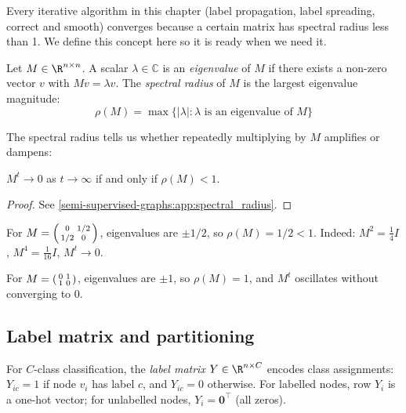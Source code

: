 \begin{notechapter}
Every iterative algorithm in this chapter (label propagation, label spreading,
correct and smooth) converges because a certain matrix has spectral radius less
than 1. We define this concept here so it is ready when we need it.

\begin{definition}
\label{semi-supervised-graphs:def:spectral_radius}
Let $M \in \R^{n \times n}$. A scalar $\lambda \in \mathbb{C}$ is an
\emph{eigenvalue} of $M$ if there exists a non-zero vector $v$ with
$Mv = \lambda v$. The \emph{spectral radius} of $M$ is the largest
eigenvalue magnitude:
\begin{equation}
\rho(M) = \max\{|\lambda| : \lambda \text{ is an eigenvalue of } M\}
\end{equation}
\end{definition}

The spectral radius tells us whether repeatedly multiplying by $M$ amplifies
or dampens:

\begin{proposition}
\label{semi-supervised-graphs:prop:spectral_powers}
$M^t \to 0$ as $t \to \infty$ if and only if $\rho(M) < 1$.
\end{proposition}

\begin{proof}
See \cref{semi-supervised-graphs:app:spectral_radius}.
\end{proof}

\begin{example}
For $M = \begin{psmallmatrix} 0 & 1/2 \\ 1/2 & 0 \end{psmallmatrix}$,
eigenvalues are $\pm 1/2$, so $\rho(M) = 1/2 < 1$. Indeed:
$M^2 = \frac{1}{4}I$, $M^4 = \frac{1}{16}I$, $M^t \to 0$.

For $M = \begin{psmallmatrix} 0 & 1 \\ 1 & 0 \end{psmallmatrix}$,
eigenvalues are $\pm 1$, so $\rho(M) = 1$, and $M^t$ oscillates without
converging to 0.
\end{example}

\subsection{Label matrix and partitioning}

\begin{definition}
\label{semi-supervised-graphs:def:label_matrix}
For $C$-class classification, the \emph{label matrix} $Y \in \R^{n \times C}$
encodes class assignments: $Y_{ic} = 1$ if node $v_i$ has label $c$, and
$Y_{ic} = 0$ otherwise. For labelled nodes, row $Y_i$ is a one-hot vector;
for unlabelled nodes, $Y_i = \mathbf{0}^\top$ (all zeros).
\end{definition}


\end{notechapter}
